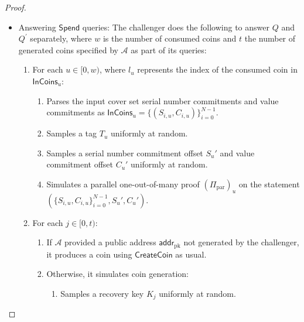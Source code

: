 \documentclass{llncs}
\newcommand{\func}[1]{\mathsf{#1}}
\newcommand{\addr}{\func{addr}}
\newcommand{\com}{\func{Com}}
\begin{document}
\begin{proof}
\begin{itemize}
\begin{enumerate}
\begin{enumerate}
\begin{enumerate}
                \item Simulates the recipient data encryption by selecting random $r$ of the proper length, and encrypting it to produce $$\func{AEADEncrypt}(k_{\text{enc}},\texttt{r},r) \to \overline{r}.$$
            \end{enumerate}
        \end{enumerate}
        \item Simulates the value proof $\Pi_{\text{val}}$ on the statement $\{ \overline{C}_j - \com(v_j,0)\}_{j=0}^{t-1}$.
        \item Assembles the transaction and adds it to the ledger as appropriate.
    \end{enumerate}
    \item Answering $\func{Spend}$ queries: The challenger does the following to answer $Q$ and $Q^\prime$ separately, where $w$ is the number of consumed coins and $t$ the number of generated coins specified by $\mathcal{A}$ as part of its queries:
    \begin{enumerate}
        \item For each $u \in [0,w)$, where $l_u$ represents the index of the consumed coin in $\func{InCoins}_u$:
        \begin{enumerate}
            \item Parses the input cover set serial number commitments and value commitments as $\func{InCoins}_u = \{(S_{i,u}, C_{i,u})\}_{i=0}^{N-1}$.
            \item Samples a tag $T_u$ uniformly at random.
            \item Samples a serial number commitment offset $S_u'$ and value commitment offset $C_u'$ uniformly at random.
            \item Simulates a parallel one-out-of-many proof $(\Pi_{\text{par}})_u$ on the statement $(\{S_{i,u}, C_{i,u}\}_{i=0}^{N-1},S_u',C_u')$.
        \end{enumerate}
        \item For each $j \in [0,t)$:
        \begin{enumerate}
            \item If $\mathcal{A}$ provided a public address $\addr_{\text{pk}}$ not generated by the challenger, it produces a coin using $\func{CreateCoin}$ as usual.
            \item Otherwise, it simulates coin generation:
            \begin{enumerate}
                \item Samples a recovery key $K_j$ uniformly at random.

\end{enumerate}
\end{enumerate}
\end{enumerate}
\end{itemize}
\end{proof}
\end{document}
